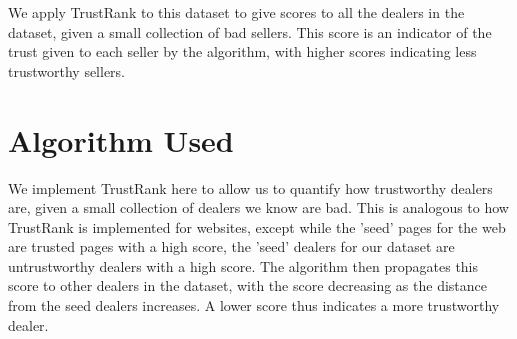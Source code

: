 \documentclass[conference]{IEEEtran}
\begin{document}
We apply TrustRank to this dataset to give scores to all the dealers in the dataset, given a small collection of bad sellers. This score is an indicator of the trust given to each seller by the algorithm, with higher scores indicating less trustworthy sellers.

\section{Algorithm Used}
We implement TrustRank here to allow us to quantify how trustworthy dealers are, given a small collection of dealers we know are bad. This is analogous to how TrustRank is implemented for websites, except while the 'seed' pages for the web are trusted pages with a high score, the 'seed' dealers for our dataset are untrustworthy dealers with a high score. The algorithm then propagates this score to other dealers in the dataset, with the score decreasing as the distance from the seed dealers increases. A lower score thus indicates a more trustworthy dealer.
\end{document}
